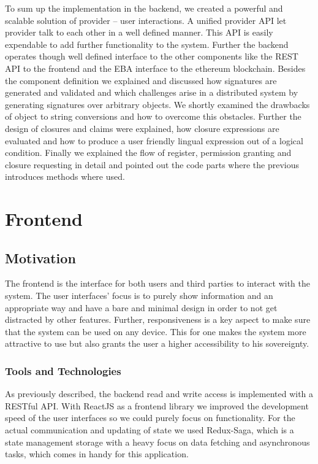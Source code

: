 To sum up the implementation in the backend, we created a powerful and scalable solution of provider – user interactions. A unified provider API let provider talk to each other in a well defined manner. This API is easily expendable to add further functionality to the system. Further the backend operates though well defined interface to the other components like the REST API to the frontend and the EBA interface to the ethereum blockchain. Besides the component definition we explained and discussed how signatures are generated and validated and which challenges arise in a distributed system by generating signatures over arbitrary objects.  We shortly examined the drawbacks of object to string conversions and how to overcome this obstacles. Further the design of closures and claims were explained, how closure expressions are evaluated and how to produce a user friendly lingual expression out of a logical condition. Finally we explained the flow of register, permission granting and closure requesting in detail and pointed out the code parts where the previous introduces methods where used.

\section{Frontend}
\label{imp:frontend}


\subsection{Motivation}

The frontend is the interface for both users and third parties to interact with the system.
The user interfaces' focus is to purely show information and an appropriate way and have a bare and minimal design
in order to not get distracted by other features.
Further, responsiveness is a key aspect to make sure that the system can be used on any device. This for one makes the
system more attractive to use but also grants the user a higher accessibility to his sovereignty.

\subsubsection{Tools and Technologies}

As previously described, the backend read and write access is implemented with a RESTful API.
With ReactJS as a frontend library we improved the development speed of the user interfaces so we could purely focus
on functionality.
For the actual communication and updating of state we used Redux-Saga, which is a state management storage with a heavy focus
on data fetching and asynchronous tasks, which comes in handy for this application.

